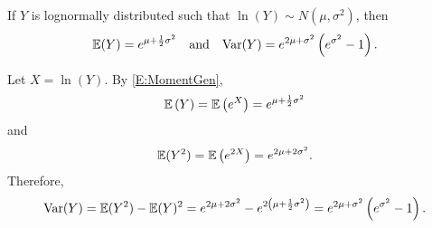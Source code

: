 \begin{frame}[fragile,t]
\begin{mythm}
	If $Y$ is lognormally distributed such that $\ln(Y)\sim N(\mu,\sigma^2)$, then
	\begin{align*}
		\mathbb{E}(Y) = e^{\mu + \frac{1}{2}\sigma^2} \quad \text{and} \quad
		\text{Var}(Y) = e^{2\mu+\sigma^2}\left(e^{\sigma^2}-1\right).
	\end{align*}
\end{mythm}
\bigskip
\pause
\begin{myproof}
	Let $X=\ln(Y)$. By \eqref{E:MomentGen},
	\begin{align*}
		\mathbb{E}\left(Y\right) = \mathbb{E}\left(e^X\right) = e^{\mu + \frac{1}{2}\sigma^2}
	\end{align*}
	and
	\begin{align*}
		\mathbb{E}(Y^2) = \mathbb{E}\left(e^{2X}\right) = e^{2\mu + 2 \sigma^2}.
	\end{align*}
	Therefore,
	\begin{align*}
		\text{Var}(Y) = \mathbb{E}(Y^2) - \mathbb{E}(Y)^2 = e^{2\mu + 2 \sigma^2} - e^{2\left(\mu +
		\frac{1}{2}\sigma^2\right)}= e^{2\mu+\sigma^2}\left(e^{\sigma^2}-1\right).
	\end{align*}
	\myEnd
\end{myproof}
\end{frame}
